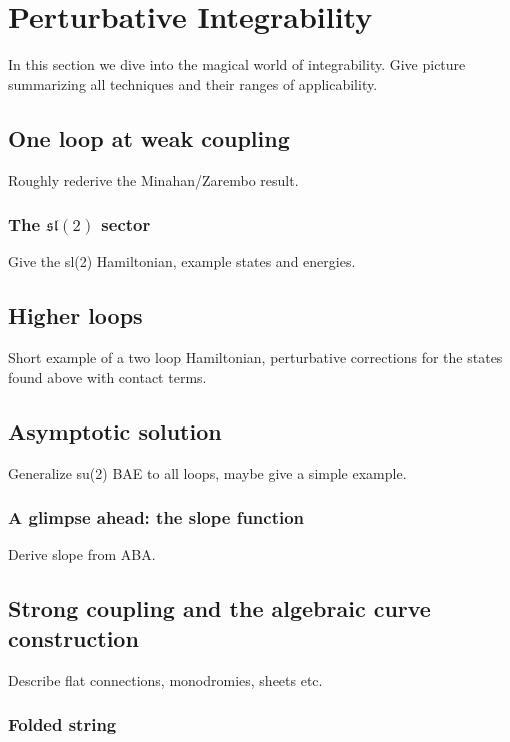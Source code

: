 
\section{Perturbative Integrability}

In this section we dive into the magical world of integrability.
Give picture summarizing all techniques and their ranges of applicability.

\subsection{One loop at weak coupling}

Roughly rederive the Minahan/Zarembo result.

\subsubsection{The $\mathfrak{sl}(2)$ sector}

Give the sl(2) Hamiltonian, example states and energies.

\subsection{Higher loops}

Short example of a two loop Hamiltonian, perturbative corrections for the states found above with contact terms.

\subsection{Asymptotic solution}

Generalize su(2) BAE to all loops, maybe give a simple example. 

\subsubsection{A glimpse ahead: the slope function}

Derive slope from ABA.

\subsection{Strong coupling and the algebraic curve construction}

Describe flat connections, monodromies, sheets etc.

\subsubsection{Folded string}

